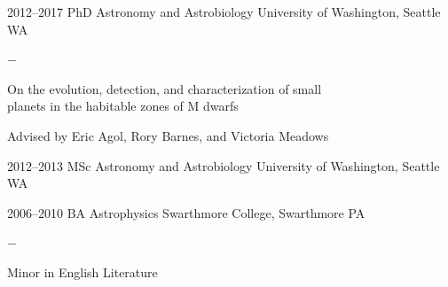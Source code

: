\documentclass[]{luger-cv} %
\begin{document}
\begin{entrylist}


    \entry
    {2012--2017}
    {PhD {\normalfont Astronomy and Astrobiology}}
    {University of Washington, Seattle WA}
    {%
        \vspace{-1em}
        \begin{list}{{\color{numcolor}$-$}}{\cvlist}
            \item On the evolution, detection, and characterization of small \\ planets in the habitable zones of M dwarfs
            \item Advised by Eric Agol, Rory Barnes, and Victoria Meadows
        \end{list}
    }


    \entry
    {2012--2013}
    {MSc {\normalfont Astronomy and Astrobiology}}
    {University of Washington, Seattle WA}


    \entry
    {2006--2010}
    {BA {\normalfont Astrophysics}}
    {Swarthmore College, Swarthmore PA}
    {\vspace{-1em}
        \begin{list}{{\color{numcolor}$-$}}{\cvlist}
            \item Minor in English Literature
        \end{list}}


\end{entrylist}


\end{document}
